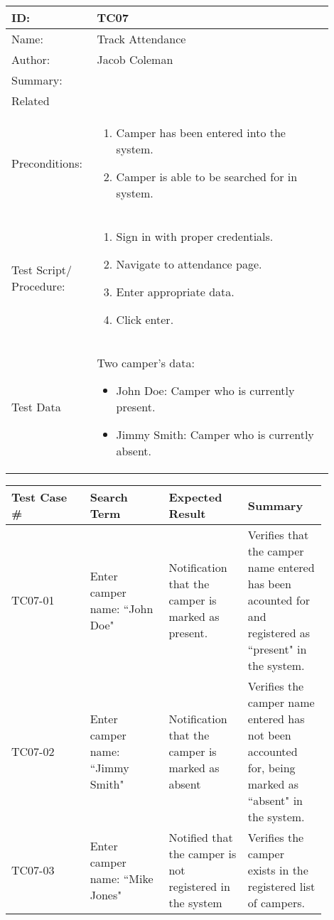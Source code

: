 \documentclass[11pt]{article}
\begin{document}
\begin{table}[H]
\begin{center}
\begin{tabular}{p{0.20\linewidth}p{0.70\linewidth}}
	ID: & TC07\\\hline
	Name: & Track Attendance \\\hline
	Author: & Jacob Coleman\\\hline
	Summary: &  \\\hline
	Related \hspace{5em} \\\hline
	Preconditions:& \begin{enumerate}[topsep=0pt] 
		\item Camper has been entered into the system.
		\item Camper is able to be searched for in system.
	\end{enumerate}\\\hline
	Test Script/ Procedure: & \begin{enumerate}[topsep=0pt]
		\item Sign in with proper credentials.
		\item Navigate to attendance page.
		\item Enter appropriate data.
		\item Click enter.
	\end{enumerate}\\\hline
	Test Data & \vspace*{.25em} Two camper's data:
	\begin{itemize}[topsep=0pt]
		\item John Doe: Camper who is currently present.
		\item Jimmy Smith: Camper who is currently absent.
	\end{itemize}
\end{tabular}
\label{des:}	
\end{center}
\end{table}

\begin{center}
\begin{longtable}{|p{0.22\linewidth}|p{0.22\linewidth}|p{0.22\linewidth}|p{0.22\linewidth}|}
	\hline
	Test Case \# & Search Term & Expected Result & Summary\\\hline
	TC07-01 & Enter camper name: ``John Doe" & Notification that the camper is marked as present. & Verifies that the camper name entered has been acounted for and registered as ``present" in the system.\vspace*{1em}\\\hline
	TC07-02 & Enter camper name: ``Jimmy Smith" & Notification that the camper is marked as absent& Verifies the camper name entered has not been accounted for, being marked as ``absent" in the system.\vspace*{1em}\\	\hline
	TC07-03 & Enter camper name: ``Mike Jones" & Notified that the camper is not registered in the system & Verifies the camper exists in the registered list of campers. \vspace*{1em}\\\hline
\end{longtable}
\end{center}
\end{document}
